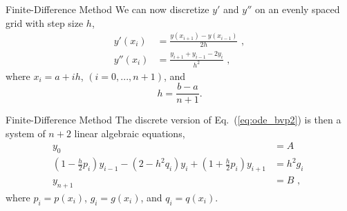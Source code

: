 \documentclass[11pt]{beamer}
\begin{document}
\begin{frame}[fragile]{Finite-Difference Method}
We can now discretize $y'$ and $y''$ on an evenly spaced grid with
step size $h$,
\begin{equation}
\begin{aligned}
y'(x_i) &= \frac{y(x_{i+1}) - y(x_{i-1})}{2h}\,\,,\\
y''(x_i) &= \frac{y_{i+1} + y_{i-1} - 2 y_i}{h^2}\,\,,
\end{aligned}
\end{equation}
where $x_i = a + i h$, $(i = 0, ... , n+1)$, and 
\begin{equation}
h = \frac{b-a}{n+1}.
\end{equation}
\end{frame}

\begin{frame}[fragile]{Finite-Difference Method}
The discrete version of Eq.~(\ref{eq:ode_bvp2}) is then a system
of $n+2$ linear algebraic equations,
\begin{equation}
\begin{aligned}
y_0 &= A\,\,\\
\left(1-\frac{h}{2}p_i \right)  y_{i-1} - \left(2-h^2q_i \right) y_i +  \left(1+\frac{h}{2}p_i \right) y_{i+1} &= h^2 g_i\,\,\\
y_{n+1} &= B\,\,,
\end{aligned}
\end{equation}
where $p_i = p(x_i)$, $g_i = g(x_i)$, and $q_i = q(x_i)$.
\end{frame}
\end{document}
